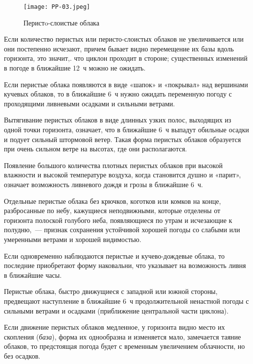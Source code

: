 \begin{figure}[htb]
  \centering{}
  \texttt{[image: PP-03.jpeg]}
  \caption{Перистo-слоистые облака}
  \label{fig:pp03}
  \small
  \centering{}
\end{figure}

 Если количество перистых или перисто-слоистых облаков не
увеличивается или они постепенно исчезают, причем бывает видно
перемещение их базы вдоль горизонта, это значит,. что циклон проходит
в стороне; существенных изменений в погоде в ближайшие 12~ч
можно не ожидать.

 Если перистые облака появляются в виде «шапок» и «покрывал» над
вершинами кучевых облаков, то в ближайшие 6~ч нужно ожидать
переменную погоду с проходящими ливневыми осадками и сильными ветрами.

 Вытягивание перистых облаков в виде длинных узких полос, выходящих
из одной точки горизонта, означает, что в ближайшие 6~ч выпадут
обильные осадки и подует сильный штормовой ветер. Такая форма перистых
облаков образуется при очень сильном ветре на высотах, где они
располагаются.

 Появление большого количества плотных перистых облаков при
высокой влажности и высокой температуре воздуха, когда становится
душно и «парит», означает возможность ливневого дождя и грозы в
ближайшие 6~ч.

 Отдельные перистые облака без крючков, коготков или комков на
конце, разбросанные по небу, кажущиеся неподвижными, которые отделены
от горизонта полоской голубого неба, появляющиеся по утрам и
исчезающие к полудню,~--- признак сохранения устойчивой хорошей погоды
со слабыми или умеренными ветрами и хорошей видимостью.

 Если одновременно наблюдаются перистые и кучево-дождевые
облака, то последние приобретают форму наковальни, что указывает на
возможность ливня в ближайшие часы.

 Перистые облака, быстро движущиеся с западной или южной
стороны, предвещают наступление в ближайшие 6~ч продолжительной
ненастной погоды с сильными ветрами и осадками (приближение
центральной части циклона).

 Если движение перистых облаков медленное, у горизонта видно
место их скопления (\textit{база}), форма их однообразна и изменяется мало,
замечается таяние облаков, то предстоящая погода будет с временным
увеличением облачности, но без осадков.

